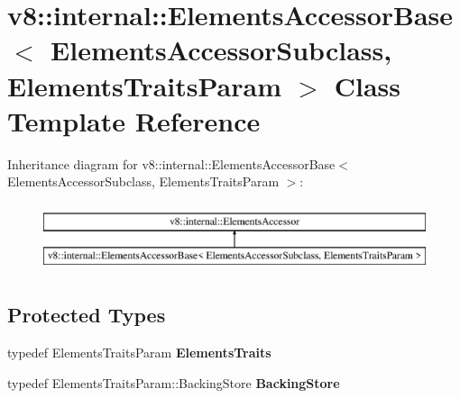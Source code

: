 \hypertarget{classv8_1_1internal_1_1_elements_accessor_base}{}\section{v8\+:\+:internal\+:\+:Elements\+Accessor\+Base$<$ Elements\+Accessor\+Subclass, Elements\+Traits\+Param $>$ Class Template Reference}
\label{classv8_1_1internal_1_1_elements_accessor_base}
Inheritance diagram for v8\+:\+:internal\+:\+:Elements\+Accessor\+Base$<$ Elements\+Accessor\+Subclass, Elements\+Traits\+Param $>$\+:\begin{figure}[H]
\begin{center}
\leavevmode
\includegraphics[height=2.000000cm]{classv8_1_1internal_1_1_elements_accessor_base}
\end{center}
\end{figure}
\subsection*{Protected Types}
\begin{DoxyCompactItemize}
\item 
\hypertarget{classv8_1_1internal_1_1_elements_accessor_base_aaaf6d11057b56b88ec440f2afbef3fd4}{}typedef Elements\+Traits\+Param {\bfseries Elements\+Traits}\label{classv8_1_1internal_1_1_elements_accessor_base_aaaf6d11057b56b88ec440f2afbef3fd4}

\item 
\hypertarget{classv8_1_1internal_1_1_elements_accessor_base_a3a8acebd50846fbbaea4aa3f39dc5444}{}typedef Elements\+Traits\+Param\+::\+Backing\+Store {\bfseries Backing\+Store}\label{classv8_1_1internal_1_1_elements_accessor_base_a3a8acebd50846fbbaea4aa3f39dc5444}

\end{DoxyCompactItemize}
